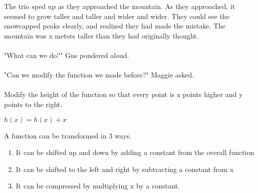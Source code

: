 { The trio sped up as they approached the mountain. As they approached, it seemed to grow taller and taller and wider and wider. 
	They could see the snowcapped peaks clearly, and realized they had made the mistake. 
	The mountain was x meters taller than they had originally thought. 
	\paragraph{} "What can we do?" Gus pondered aloud.
	\paragraph{} "Can we modify the function we made before?" Maggie asked.
	\paragraph{} Modify the height of the function so that every point is x points higher and y points to the right.
}
{
	$h(x) = h(x) + x$
}
{ A function can be transformed in 3 ways.
	\begin{enumerate}
		\item It can be shifted up and down by adding a constant from the overall function
		\item It can be shifted to the left and right by subtracting a constant from x
		\item It can be compressed by multiplying x by a constant.
	\end{enumerate}
}
{}

